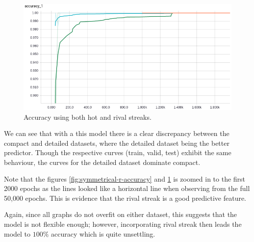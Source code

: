 \documentclass{article} %
\begin{document}
\begin{figure}[!htb]
\endminipage
{}%
  \includegraphics[width=\linewidth]{plots/model1/symmetrical/streak-hr/accuracy.png}
  \caption{Accuracy using both hot and rival streaks.}\label{fig:symmetrical-hr-accuracy}
\endminipage
\end{figure}

We can see that with a this model there is a clear discrepancy between the compact and detailed datasets, where the detailed dataset being the better predictor.
Though the respective curves (train, valid, test) exhibit the same behaviour, the curves for the detailed dataset dominate compact.

Note that the figures \ref{fig:symmetrical-r-accuracy} and \ref{fig:symmetrical-hr-accuracy} is zoomed in to the first 2000 epochs as the lines looked like a horizontal line when observing from the full 50,000 epochs.  This is evidence that the rival streak is a good predictive feature.

Again, since all graphs do not overfit on either dataset, this suggests that the model is not flexible enough; however, incorporating rival streak then leads the model to $100\%$ accuracy which is quite unsettling.
\end{document}
